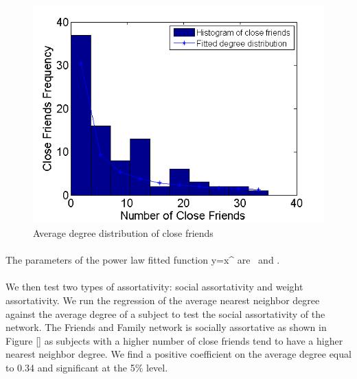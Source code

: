 \documentclass[11pt]{article}
\begin{document}
\begin{figure}[!ht]
\center
   \includegraphics[scale = 0.9]{friends_distribution_figure1.png}
   \caption{\label{1} Average degree distribution of close friends}
\end{figure}

\paragraph{}
The parameters of the power law fitted function y=\alpha x^\beta \]   are  \] \ and \].

\paragraph{}
We then test two types of assortativity: social assortativity and weight assortativity. We run the regression of the average nearest neighbor degree against the average degree of a subject to test the social assortativity of the network. The Friends and Family network is socially assortative as shown in Figure [] as subjects with a higher number of close friends tend to have a higher nearest neighbor degree. We find a positive coefficient on the average degree equal to 0.34 and significant at the 5\% level.
\end{document}
